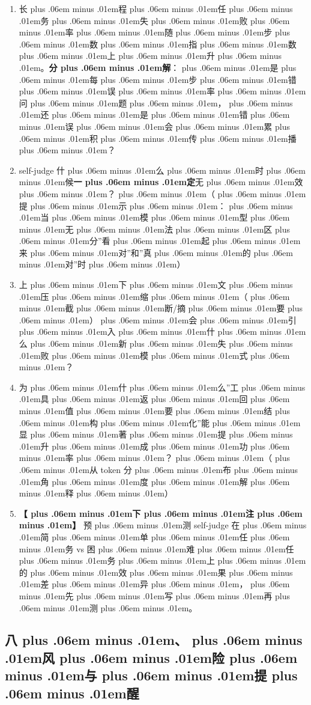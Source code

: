 \documentclass[
]{article}
\providecommand{\tightlist}{%
  \setlength{\itemsep}{0pt}\setlength{\parskip}{0pt}}
\def\zh#1{{\zhfont #1}}
\def\zhglue{\hskip0pt plus .06em minus .01em}
\begin{document}
\begin{enumerate}
\def\labelenumi{\arabic{enumi}.}
\tightlist
\item
  \zh{长\zhglue 程\zhglue 任\zhglue 务\zhglue 失\zhglue 败\zhglue 率\zhglue 随\zhglue 步\zhglue 数\zhglue 指\zhglue 数\zhglue 上\zhglue 升\zhglue 。}\textbf{\zh{分\zhglue 解}}\zh{：\zhglue 是\zhglue 每\zhglue 步\zhglue 错\zhglue 误\zhglue 率\zhglue 问\zhglue 题\zhglue ，\zhglue 还\zhglue 是\zhglue 错\zhglue 误\zhglue 会\zhglue 累\zhglue 积\zhglue 传\zhglue 播\zhglue ？}
\item
  self-judge \zh{什\zhglue 么\zhglue 时\zhglue 候}\textbf{\zh{一\zhglue 定}}\zh{无\zhglue 效\zhglue ？\zhglue （\zhglue 提\zhglue 示\zhglue ：\zhglue 当\zhglue 模\zhglue 型\zhglue 无\zhglue 法\zhglue 区\zhglue 分}''\zh{看\zhglue 起\zhglue 来\zhglue 对}''\zh{和}''\zh{真\zhglue 的\zhglue 对}''\zh{时\zhglue ）}
\item
  \zh{上\zhglue 下\zhglue 文\zhglue 压\zhglue 缩\zhglue （\zhglue 截\zhglue 断}/\zh{摘\zhglue 要\zhglue ）\zhglue 会\zhglue 引\zhglue 入\zhglue 什\zhglue 么\zhglue 新\zhglue 失\zhglue 败\zhglue 模\zhglue 式\zhglue ？}
\item
  \zh{为\zhglue 什\zhglue 么}''\zh{工\zhglue 具\zhglue 返\zhglue 回\zhglue 值\zhglue 要\zhglue 结\zhglue 构\zhglue 化}''\zh{能\zhglue 显\zhglue 著\zhglue 提\zhglue 升\zhglue 成\zhglue 功\zhglue 率\zhglue ？\zhglue （\zhglue 从} token \zh{分\zhglue 布\zhglue 角\zhglue 度\zhglue 解\zhglue 释\zhglue ）}
\item
  \textbf{\zh{【\zhglue 下\zhglue 注\zhglue 】}} \zh{预\zhglue 测} self-judge \zh{在\zhglue 简\zhglue 单\zhglue 任\zhglue 务} vs \zh{困\zhglue 难\zhglue 任\zhglue 务\zhglue 上\zhglue 的\zhglue 效\zhglue 果\zhglue 差\zhglue 异\zhglue ，\zhglue 先\zhglue 写\zhglue 再\zhglue 测\zhglue 。}
\end{enumerate}

\subsection{\zh{八\zhglue 、\zhglue 风\zhglue 险\zhglue 与\zhglue 提\zhglue 醒}}\label{ux516bux98ceux9669ux4e0eux63d0ux9192-8}
\end{document}
